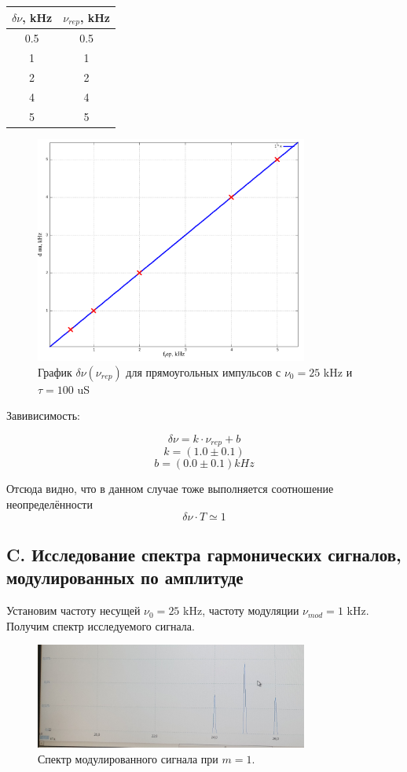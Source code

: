 \documentclass{article}
\begin{document}
\begin{table}[H]
    \centering
    \begin{tabular}{|c|c|}
        \hline
        \(\delta\nu\), kHz & \(\nu_{rep}\), kHz\\\hline
        0.5 & 0.5 \\\hline
        1   & 1   \\\hline
        2   & 2   \\\hline
        4   & 4   \\\hline
        5   & 5   \\\hline
    \end{tabular}
\end{table}

\begin{figure}[H]
    \centering
    \includegraphics[width=0.8\textwidth]{dnu_frep.png}
    \caption{График \( \delta\nu(\nu_{rep}) \) для прямоугольных импульсов с \( \nu_0 = 25\) kHz и \(\tau = 100\) uS}
    \label{pic_dnu_tau}
\end{figure}

Завивисимость:

\[ \delta\nu = k\cdot\nu_{rep} + b \]
\[ k = (1.0 \pm 0.1) \]
\[ b = (0.0 \pm 0.1) kHz\]

Отсюда видно, что в данном случае тоже выполняется соотношение неопределённости
\[ \delta\nu\cdot T \simeq 1 \]


\subsection{C. Исследование спектра гармонических сигналов, модулированных по амплитуде}
Установим частоту несущей \( \nu_0 = 25 \) kHz, частоту модуляции \( \nu_{mod} = 1 \) kHz.
Получим спектр исследуемого сигнала. 
\begin{figure}[H]
    \centering
    \includegraphics[width=0.8\textwidth]{mod_1.jpg}
    \caption{Спектр модулированного сигнала при \( m = 1 \).}
    \label{spec_mod}
\end{figure}
\end{document}
